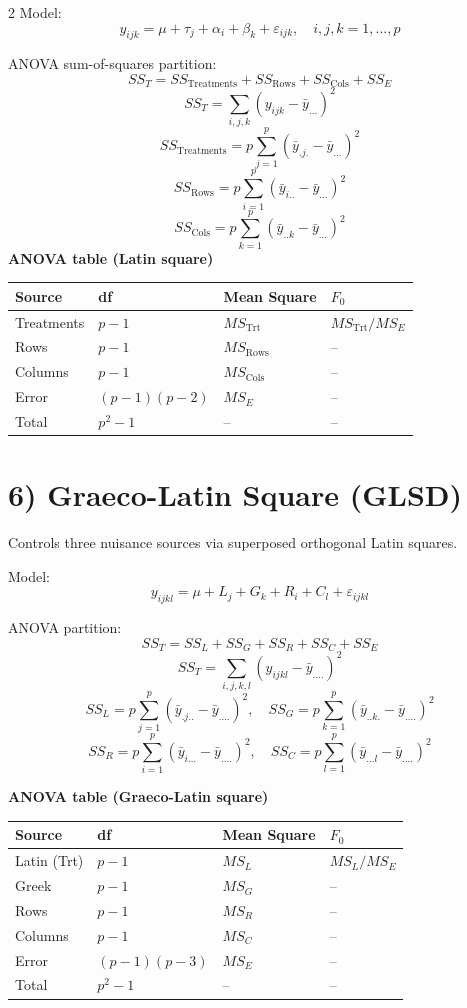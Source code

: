 \documentclass[10pt, letterpaper]{article}
\begin{document}
\begin{multicols}{2}
Model:
\[
y_{ijk}=\mu+\tau_j+\alpha_i+\beta_k+\varepsilon_{ijk},\quad i,j,k=1,\dots,p
\]

ANOVA sum-of-squares partition:
\[
SS_T=SS_{\text{Treatments}}+SS_{\text{Rows}}+SS_{\text{Cols}}+SS_E
\]
\[
SS_T=\sum_{i,j,k}(y_{ijk}-\bar y_{...})^2
\]
\[
SS_{\text{Treatments}}=p\sum_{j=1}^{p}(\bar y_{.j.}-\bar y_{...})^2
\]
\[
SS_{\text{Rows}}=p\sum_{i=1}^{p}(\bar y_{i..}-\bar y_{...})^2
\]
\[
SS_{\text{Cols}}=p\sum_{k=1}^{p}(\bar y_{..k}-\bar y_{...})^2
\]
\textbf{ANOVA table (Latin square)}
\begin{center}
\footnotesize
\begin{tabular}{llll}
\toprule
Source & df & Mean Square & $F_0$ \\
\midrule
Treatments & $p-1$ & $MS_{\text{Trt}}$ & $MS_{\text{Trt}}/MS_E$ \\
Rows & $p-1$ & $MS_{\text{Rows}}$ & -- \\
Columns & $p-1$ & $MS_{\text{Cols}}$ & --\\
Error & $(p-1)(p-2)$ & $MS_E$ & -- \\
Total & $p^2-1$ & -- & -- \\
\bottomrule
\end{tabular}
\end{center}

\section*{6) Graeco-Latin Square (GLSD)}
Controls three nuisance sources via superposed orthogonal Latin squares.

Model:
\[
y_{ijkl}=\mu+L_j+G_k+R_i+C_l+\varepsilon_{ijkl}
\]

ANOVA partition:
\[
SS_T=SS_L+SS_G+SS_R+SS_C+SS_E
\]
\[
SS_T=\sum_{i,j,k,l}(y_{ijkl}-\bar y_{....})^2
\]
\[
SS_L=p\sum_{j=1}^{p}(\bar y_{.j..}-\bar y_{....})^2,
\quad
SS_G=p\sum_{k=1}^{p}(\bar y_{..k.}-\bar y_{....})^2
\]
\[
SS_R=p\sum_{i=1}^{p}(\bar y_{i...}-\bar y_{....})^2,
\quad
SS_C=p\sum_{l=1}^{p}(\bar y_{...l}-\bar y_{....})^2
\]

\textbf{ANOVA table (Graeco-Latin square)}
\begin{center}
\footnotesize
\begin{tabular}{llll}
\toprule
Source & df & Mean Square & $F_0$ \\
\midrule
Latin (Trt) & $p-1$ & $MS_L$ & $MS_L/MS_E$ \\
Greek & $p-1$ & $MS_G$ & -- \\
Rows & $p-1$ & $MS_R$ & --\\
Columns & $p-1$ & $MS_C$ & -- \\
Error & $(p-1)(p-3)$ & $MS_E$ & -- \\
Total & $p^2-1$ & -- & -- \\
\bottomrule
\end{tabular}
\end{center}


\end{multicols}
\end{document}
